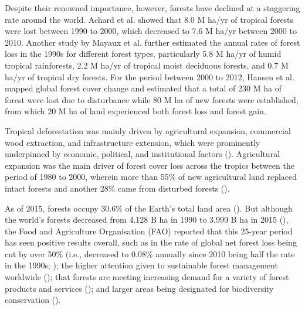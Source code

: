 Despite their renowned importance, however, forests have declined at a staggering rate around the world. Achard et al.  \citeyearpar{achard_determination_2014} showed that 8.0 M ha/yr of tropical forests were lost between 1990 to 2000, which decreased to 7.6 M ha/yr between 2000 to 2010. Another study by Mayaux et al. \citeyearpar{mayaux_tropical_2005} further estimated the annual rates of forest loss in the 1990s for different forest types, particularly 5.8 M ha/yr of humid tropical rainforests, 2.2 M ha/yr of tropical moist deciduous forests, and 0.7 M ha/yr of tropical dry forests. For the period between 2000 to 2012, Hansen et al. \citeyearpar{hansen_high-resolution_2013} mapped global forest cover change and estimated that a total of 230 M ha of forest were lost due to disturbance while 80 M ha of new forests were established, from which 20 M ha of land experienced both forest loss and forest gain.

Tropical deforestation was mainly driven by agricultural expansion, commercial wood extraction, and infrastructure extension, which were prominently underpinned by economic, political, and institutional factors (\cite{geist_proximate_2002}). Agricultural expansion was the main driver of forest cover loss across the tropics between the period of 1980 to 2000, wherein more than 55\% of new agricultural land replaced intact forests and another 28\% came from disturbed forests (\cite{gibbs_tropical_2010}).

As of 2015, forests occupy 30.6\% of the Earth's total land area (\cite{fao_global_2015}). But although the world's forests decreased from 4.128 B ha in 1990 to 3.999 B ha in 2015 (\cite{keenan_dynamics_2015}), the Food and Agriculture Organisation (FAO) reported that this 25-year period has seen positive results overall, such as in the rate of global net forest loss being cut by over 50\% (i.e., decreased to 0.08\% annually since 2010 being half the rate in the 1990s; \cite{sloan_forest_2015}); the higher attention given to sustainable forest management worldwide (\cite{macdicken_global_2015}); that forests are meeting increasing demand for a variety of forest products and services (\cite{payn_changes_2015}); and larger areas being designated for biodiversity conservation (\cite{morales-hidalgo_status_2015}).

